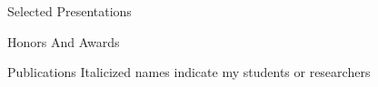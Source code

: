 \documentclass{resume2} %
\begin{document}
\begin{rSection}{Selected Presentations}

\end{rSection}



\vspace*{1 em}
\clearpage
\begin{rSection}{Honors And Awards}

\end{rSection}


\begin{rSection}{Publications}
Italicized names indicate my students or researchers

\end{rSection}






\end{document}
